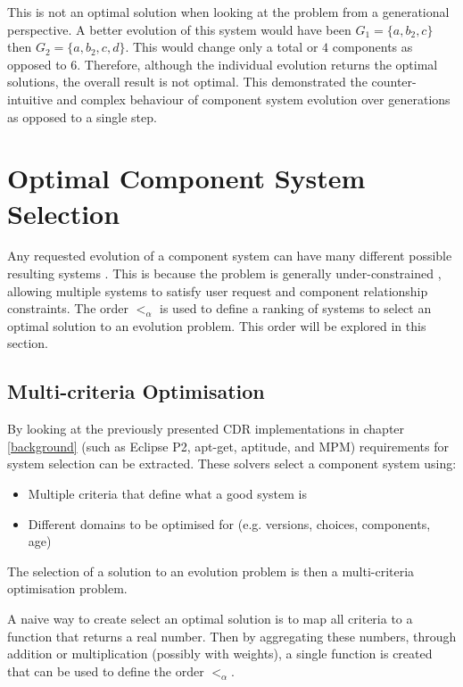 This is not an optimal solution when looking at the problem from a generational perspective.
A better evolution of this system would have been $G_1 = \{a,b_2,c\}$ then $G_2 = \{a,b_2,c,d\}$.
This would change only a total or $4$ components as opposed to $6$.
Therefore, although the individual evolution returns the optimal solutions, the overall result is not optimal.
This demonstrated the counter-intuitive and complex behaviour of component system evolution over generations as opposed to a single step.


\section{Optimal Component System Selection}
\label{formal.opt}
Any requested evolution of a component system can have many different possible resulting systems \citep{leBerre2010}.
This is because the problem is generally under-constrained \citep{Berre2008}, allowing multiple systems to satisfy user request and component relationship constraints.
The order $<_{\alpha}$ is used to define a ranking of systems to select an optimal solution to an evolution problem.
This order will be explored in this section.

\subsection{Multi-criteria Optimisation}
By looking at the previously presented CDR implementations in chapter \ref{background} (such as Eclipse P2, apt-get, aptitude, and MPM) requirements for system selection can be extracted.
These solvers select a component system using:
\begin{itemize}
  \item Multiple criteria that define what a good system is
  \item Different domains to be optimised for (e.g. versions, choices, components, age)
\end{itemize} 
The selection of a solution to an evolution problem is then a multi-criteria optimisation problem.

A naive way to create select an optimal solution is to map all criteria to a function that returns a real number.
Then by aggregating these numbers, through addition or multiplication (possibly with weights), a single function is created that can be used to define the order $<_{\alpha}$. 

